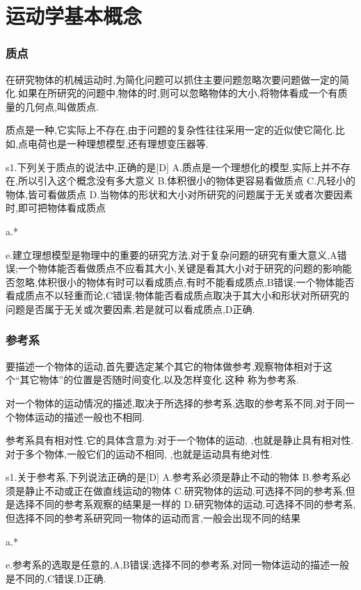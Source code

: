 \section{运动学基本概念}
\subsubsection{质点}

在研究物体的机械运动时,为简化问题可以抓住主要问题忽略次要问题做一定的简化.如果在所研究的问题中,物体的时,则可以忽略物体的大小,将物体看成一个有质量的几何点,叫做质点.

质点是一种,它实际上不存在,由于问题的复杂性往往采用一定的近似使它简化.比如,点电荷也是一种理想模型,还有理想变压器等.

\begin{selection}
  s1.下列关于质点的说法中,正确的是[D]
  A.质点是一个理想化的模型,实际上并不存在,所以引入这个概念没有多大意义
  B.体积很小的物体更容易看做质点
  C.凡轻小的物体,皆可看做质点
  D.当物体的形状和大小对所研究的问题属于无关或者次要因素时,即可把物体看成质点

  a.*

  e.建立理想模型是物理中的重要的研究方法,对于复杂问题的研究有重大意义,A错误;一个物体能否看做质点不应看其大小,关键是看其大小对于研究的问题的影响能否忽略,体积很小的物体有时可以看成质点,有时不能看成质点,B错误;一个物体能否看成质点不以轻重而论,C错误;物体能否看成质点取决于其大小和形状对所研究的问题是否属于无关或次要因素,若是就可以看成质点,D正确.

\end{selection}
\subsubsection{参考系}
要描述一个物体的运动,首先要选定某个其它的物体做参考,观察物体相对于这个``其它物体''的位置是否随时间变化,以及怎样变化.这种  称为参考系.

对一个物体的运动情况的描述,取决于所选择的参考系,选取的参考系不同,对于同一个物体运动的描述一般也不相同.

参考系具有相对性.它的具体含意为:对于一个物体的运动,  ,也就是静止具有相对性.对于多个物体,一般它们的运动不相同,  ,也就是运动具有绝对性.

\begin{selection}
  s1.关于参考系,下列说法正确的是[D]
  A.参考系必须是静止不动的物体
  B.参考系必须是静止不动或正在做直线运动的物体
  C.研究物体的运动,可选择不同的参考系,但是选择不同的参考系观察的结果是一样的
  D.研究物体的运动,可选择不同的参考系,但选择不同的参考系研究同一物体的运动而言,一般会出现不同的结果

  a.*

  e.参考系的选取是任意的,A,B错误;选择不同的参考系,对同一物体运动的描述一般是不同的,C错误,D正确.

\end{selection}

